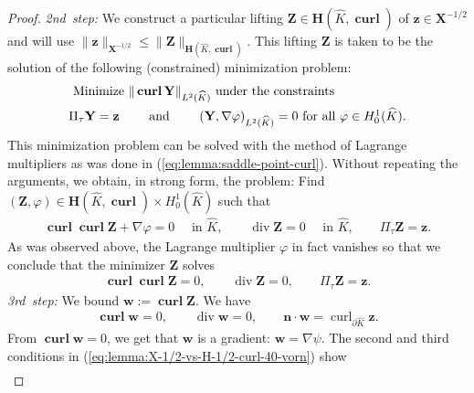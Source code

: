 \documentclass{article}
\begin{document}
\begin{proof}
\emph{2nd~step:} 
We construct a particular lifting ${\mathbf Z} \in {\mathbf H}(\widehat K,\operatorname{\mathbf{curl}})$ 
of ${\mathbf z} \in {\mathbf X}^{-1/2}$ and will use 
$\|{\mathbf z}\|_{{\mathbf X}^{-1/2}} \leq \|{\mathbf Z}\|_{{\mathbf H}(\widehat K,\operatorname{\mathbf{curl}})}$. 
This lifting ${\mathbf Z}$ is taken to be the solution of the following (constrained)
minimization problem:
\begin{align*}
& \mbox{ Minimize } \|\operatorname{\mathbf{curl}} {\mathbf Y}\|_{L^2(\widehat{K})} 
\mbox{ under the constraints} \\
& \mbox{$\Pi_\tau {\mathbf Y} = {\mathbf z}$ \qquad and \qquad $({\mathbf Y} ,\nabla \varphi)_{L^2(\widehat{K})} = 0$
for all $\varphi \in H^1_0(\widehat{K})$.}
\end{align*}
This minimization problem can be solved with the method of Lagrange multipliers as was done 
in (\ref{eq:lemma:saddle-point-curl}). Without repeating the arguments, 
we obtain, in strong form, the problem:
Find $({\mathbf Z},\varphi) \in {\mathbf H}(\widehat{K},\operatorname{\mathbf{curl}}) \times H^1_0(\widehat{K})$ such that
\begin{align*}
\operatorname{\mathbf{curl}}
\operatorname{\mathbf{curl}} {\mathbf Z} + \nabla \varphi = 0 \quad \mbox{ in $\widehat{K}$}, 
\qquad 
\operatorname{div} {\mathbf Z} = 0 \quad \mbox{ in $\widehat{K}$}, 
\qquad \Pi_\tau {\mathbf Z} = {\mathbf z}. 
\end{align*}
As was observed above, the Lagrange multiplier $\varphi$ in fact vanishes so that we conclude that 
the minimizer ${\mathbf Z}$ solves  
\begin{align*}
\operatorname{\mathbf{curl}} \operatorname{\mathbf{curl}} {\mathbf Z}  = 0, \qquad 
\operatorname{div} {\mathbf Z}  = 0, 
\qquad \Pi_\tau {\mathbf Z} = {\mathbf z}. 
\end{align*}
\emph{3rd~step:} We bound ${\mathbf w}:= \operatorname{\mathbf{curl}} {\mathbf Z}$. We have
\begin{align}
\label{eq:lemma:X-1/2-vs-H-1/2-curl-40-vorn}
\operatorname{\mathbf{curl}} {\mathbf w}  = 0 , \qquad 
\operatorname{div} {\mathbf w}  = 0, \qquad  
{\mathbf n} \cdot {\mathbf w}  = \operatorname{curl}_{\partial\widehat{K}} {\mathbf z}. 
\end{align}
{}From $\operatorname{\mathbf{curl}} {\mathbf w} = 0$, we get that ${\mathbf w}$ is a gradient:
${\mathbf w} = \nabla \psi$. The second and third conditions in (\ref{eq:lemma:X-1/2-vs-H-1/2-curl-40-vorn}) show
\begin{align*}

\end{align*}
\end{proof}
\end{document}
